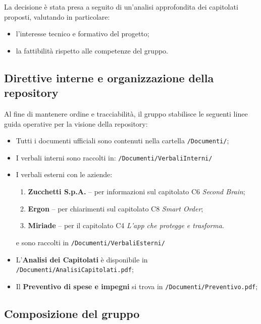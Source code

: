 \documentclass[a4paper,12pt]{article}
\begin{document}
La decisione è stata presa a seguito di un’analisi approfondita dei capitolati proposti, valutando in particolare:
\begin{itemize}
    \item l’interesse tecnico e formativo del progetto;
    \item la fattibilità rispetto alle competenze del gruppo.
\end{itemize}

\subsection{Direttive interne e organizzazione della repository}

Al fine di mantenere ordine e tracciabilità, il gruppo stabilisce le seguenti linee guida operative per la visione della repository:
\begin{itemize}
    \item Tutti i documenti ufficiali sono contenuti nella cartella \texttt{/Documenti/};
    \item I verbali interni sono raccolti in: \texttt{/Documenti/VerbaliInterni/}
    \item I verbali esterni con le aziende:
    \begin{enumerate}
        \item \textbf{Zucchetti S.p.A.} – per informazioni sul capitolato C6 \emph{Second Brain};
        \item \textbf{Ergon} – per chiarimenti sul capitolato C8 \emph{Smart Order};
        \item \textbf{Miriade} – per il capitolato C4 \emph{L'app che protegge e trasforma}.
    \end{enumerate}
    e sono raccolti in  \texttt{/Documenti/VerbaliEsterni/}
    
    \item L’\textbf{Analisi dei Capitolati} è disponibile in \texttt{/Documenti/AnalisiCapitolati.pdf};
    \item Il \textbf{Preventivo di spese e impegni} si trova in \texttt{/Documenti/Preventivo.pdf};
\end{itemize}

\subsection{Composizione del gruppo}
\end{document}
